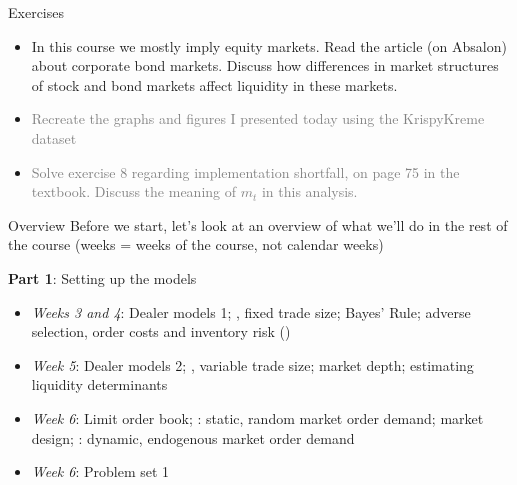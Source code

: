 \begin{frame}{Exercises}
	\begin{itemize}
		\item In this course we mostly imply equity markets. Read the article (on Absalon) about corporate bond markets. Discuss how differences in market structures of stock and bond markets affect liquidity in these markets.
		\item \textcolor{gray}{Recreate the graphs and figures I presented today using the KrispyKreme dataset}
		\item \textcolor{gray}{Solve exercise 8 regarding implementation shortfall, on page 75 in the textbook.
		Discuss the meaning of $m_t$ in this analysis.}
	\end{itemize}
\end{frame}


\begin{frame}{Overview}
	Before we start, let's look at an overview of what we'll do in the rest of the course (weeks = weeks of the course, not calendar weeks)
	
	\textbf{Part 1}: Setting up the models
	\begin{itemize}
	\item \textit{Weeks 3 and 4}: Dealer models 1; , fixed trade size; Bayes' Rule; adverse selection, order costs and inventory risk ()
	\item \textit{Week 5}: Dealer models 2; , variable trade size; market depth; estimating liquidity determinants
	\item \textit{Week 6}: Limit order book; : static, random market order demand; market design; : dynamic, endogenous market order demand
	\item \textit{Week 6}: Problem set 1
	\end{itemize}
\end{frame}


